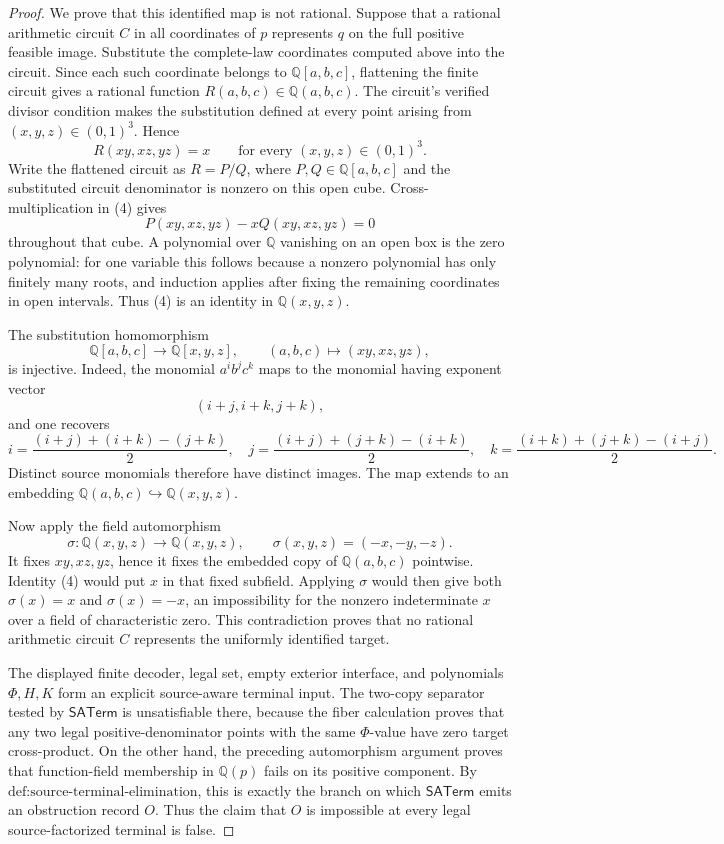 \documentclass{article}
\begin{document}
\begin{proof}
We prove that this identified map is not rational.  Suppose that a rational arithmetic circuit \(C\) in all coordinates of \(p\) represents \(q\) on the full positive feasible image.  Substitute the complete-law coordinates computed above into the circuit.  Since each such coordinate belongs to \(\mathbb Q[a,b,c]\), flattening the finite circuit gives a rational function \(R(a,b,c)\in\mathbb Q(a,b,c)\).  The circuit's verified divisor condition makes the substitution defined at every point arising from \((x,y,z)\in(0,1)^3\).  Hence
\[
 R(xy,xz,yz)=x
 \qquad\text{for every }(x,y,z)\in(0,1)^3.
 \tag{4}
\]
Write the flattened circuit as \(R=P/Q\), where \(P,Q\in\mathbb Q[a,b,c]\) and the substituted circuit denominator is nonzero on this open cube.  Cross-multiplication in (4) gives
\[
 P(xy,xz,yz)-xQ(xy,xz,yz)=0
\]
throughout that cube.  A polynomial over \(\mathbb Q\) vanishing on an open box is the zero polynomial: for one variable this follows because a nonzero polynomial has only finitely many roots, and induction applies after fixing the remaining coordinates in open intervals.  Thus (4) is an identity in \(\mathbb Q(x,y,z)\).

The substitution homomorphism
\[
 \mathbb Q[a,b,c]\longrightarrow\mathbb Q[x,y,z],
 \qquad (a,b,c)\longmapsto(xy,xz,yz),
\]
is injective.  Indeed, the monomial \(a^i b^j c^k\) maps to the monomial having exponent vector
\[
 (i+j,i+k,j+k),
\]
and one recovers
\[
 i=\frac{(i+j)+(i+k)-(j+k)}2,
 \quad
 j=\frac{(i+j)+(j+k)-(i+k)}2,
 \quad
 k=\frac{(i+k)+(j+k)-(i+j)}2.
\]
Distinct source monomials therefore have distinct images.  The map extends to an embedding \(\mathbb Q(a,b,c)\hookrightarrow\mathbb Q(x,y,z)\).

Now apply the field automorphism
\[
 \sigma:\mathbb Q(x,y,z)\longrightarrow\mathbb Q(x,y,z),
 \qquad \sigma(x,y,z)=(-x,-y,-z).
\]
It fixes \(xy,xz,yz\), hence it fixes the embedded copy of \(\mathbb Q(a,b,c)\) pointwise.  Identity (4) would put \(x\) in that fixed subfield.  Applying \(\sigma\) would then give both \(\sigma(x)=x\) and \(\sigma(x)=-x\), an impossibility for the nonzero indeterminate \(x\) over a field of characteristic zero.  This contradiction proves that no rational arithmetic circuit \(C\) represents the uniformly identified target.

The displayed finite decoder, legal set, empty exterior interface, and polynomials \(\Phi,H,K\) form an explicit source-aware terminal input.  The two-copy separator tested by \(\mathsf{SATerm}\) is unsatisfiable there, because the fiber calculation proves that any two legal positive-denominator points with the same \(\Phi\)-value have zero target cross-product.  On the other hand, the preceding automorphism argument proves that function-field membership in \(\mathbb Q(p)\) fails on its positive component.  By \(\text{def:source-terminal-elimination}\), this is exactly the branch on which \(\mathsf{SATerm}\) emits an obstruction record \(O\).  Thus the claim that \(O\) is impossible at every legal source-factorized terminal is false.


\end{proof}
\end{document}
